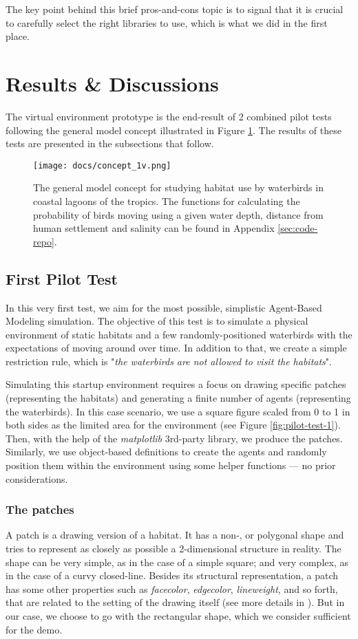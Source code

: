 \noindent
The key point behind this brief pros-and-cons topic is to signal that it is crucial to carefully select the right libraries to use, which is what we did in the first place.

\section{Results \& Discussions}
The virtual environment prototype is the end-result of 2 combined pilot tests following the general model concept illustrated in Figure \ref{fig:concept-1v}. The results of these tests are presented in the subsections that follow.

\begin{figure}[h!]
    \centering
    \texttt{[image: docs/concept\_1v.png]}
    \caption{The general model concept for studying habitat use by waterbirds in coastal lagoons of the tropics. The functions for calculating the probability of birds moving using a given water depth, distance from human settlement and salinity can be found in Appendix \ref{sec:code-repo}.}
    \label{fig:concept-1v}
\end{figure}

\subsection{First Pilot Test}
In this very first test, we aim for the most possible, simplistic Agent-Based Modeling simulation. The objective of this test is to simulate a physical environment of static habitats and a few randomly-positioned waterbirds with the expectations of moving around over time. In addition to that, we create a simple restriction rule, which is "\textit{the waterbirds are not allowed to visit the habitats}".

Simulating this startup environment requires a focus on drawing specific patches (representing the habitats) and generating a finite number of agents (representing the waterbirds). In this case scenario, we use a square figure scaled from 0 to 1 in both sides as the limited area for the environment (see Figure \ref{fig:pilot-test-1}). Then, with the help of the \emph{matplotlib} 3rd-party library, we produce the patches. Similarly, we use object-based definitions to create the agents and randomly position them within the environment using some helper functions — no prior considerations.

\subsubsection{The patches}
A patch is a drawing version of a habitat. It has a non-, or polygonal shape and tries to represent as closely as possible a 2-dimensional structure in reality. The shape can be very simple, as in the case of a simple square; and very complex, as in the case of a curvy closed-line. Besides its structural representation, a patch has some other properties such as \emph{facecolor}, \emph{edgecolor}, \emph{lineweight}, and so forth, that are related to the setting of the drawing itself (see more details in \cite{matplotlib.patches}). But in our case, we choose to go with the rectangular shape, which we consider sufficient for the demo.

